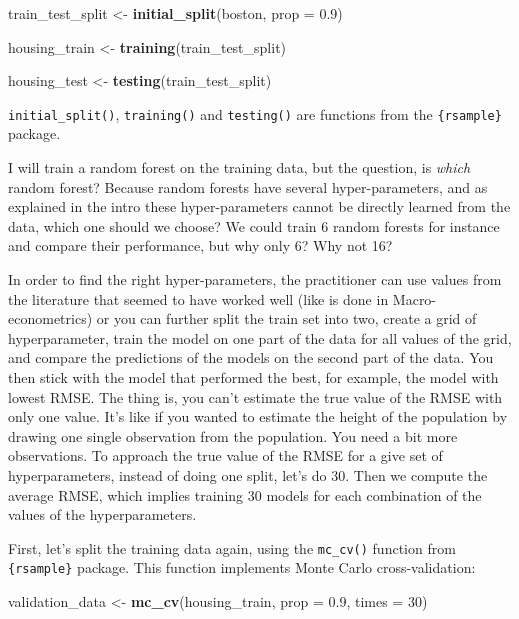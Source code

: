 \documentclass[
]{article}
\newenvironment{Shaded}{\begin{snugshade}}{\end{snugshade}}
\newcommand{\DataTypeTok}[1]{\textcolor[rgb]{0.13,0.29,0.53}{#1}}
\newcommand{\DecValTok}[1]{\textcolor[rgb]{0.00,0.00,0.81}{#1}}
\newcommand{\FloatTok}[1]{\textcolor[rgb]{0.00,0.00,0.81}{#1}}
\newcommand{\KeywordTok}[1]{\textcolor[rgb]{0.13,0.29,0.53}{\textbf{#1}}}
\newcommand{\NormalTok}[1]{#1}
\newcommand{\StringTok}[1]{\textcolor[rgb]{0.31,0.60,0.02}{#1}}
\begin{document}
\begin{Shaded}
\begin{Highlighting}[]
\NormalTok{train\_test\_split \textless{}{-}}\StringTok{ }\KeywordTok{initial\_split}\NormalTok{(boston, }\DataTypeTok{prop =} \FloatTok{0.9}\NormalTok{)}

\NormalTok{housing\_train \textless{}{-}}\StringTok{ }\KeywordTok{training}\NormalTok{(train\_test\_split)}

\NormalTok{housing\_test \textless{}{-}}\StringTok{ }\KeywordTok{testing}\NormalTok{(train\_test\_split)}
\end{Highlighting}
\end{Shaded}

\texttt{initial\_split()}, \texttt{training()} and \texttt{testing()} are functions from the \texttt{\{rsample\}} package.

I will train a random forest on the training data, but the question, is \emph{which} random forest?
Because random forests have several hyper-parameters, and as explained in the intro these
hyper-parameters cannot be directly learned from the data, which one should we choose? We could
train 6 random forests for instance and compare their performance, but why only 6? Why not 16?

In order to find the right hyper-parameters, the practitioner can
use values from the literature that seemed to have worked well (like is done in Macro-econometrics)
or you can further split the train set into two, create a grid of hyperparameter, train the model
on one part of the data for all values of the grid, and compare the predictions of the models on the
second part of the data. You then stick with the model that performed the best, for example, the
model with lowest RMSE. The thing is, you can't estimate the true value of the RMSE with only
one value. It's like if you wanted to estimate the height of the population by drawing one single
observation from the population. You need a bit more observations. To approach the true value of the
RMSE for a give set of hyperparameters, instead of doing one split, let's do 30. Then we
compute the average RMSE, which implies training 30 models for each combination of the values of the
hyperparameters.

First, let's split the training data again, using the \texttt{mc\_cv()} function from \texttt{\{rsample\}} package.
This function implements Monte Carlo cross-validation:

\begin{Shaded}
\begin{Highlighting}[]
\NormalTok{validation\_data \textless{}{-}}\StringTok{ }\KeywordTok{mc\_cv}\NormalTok{(housing\_train, }\DataTypeTok{prop =} \FloatTok{0.9}\NormalTok{, }\DataTypeTok{times =} \DecValTok{30}\NormalTok{)}
\end{Highlighting}
\end{Shaded}
\end{document}
